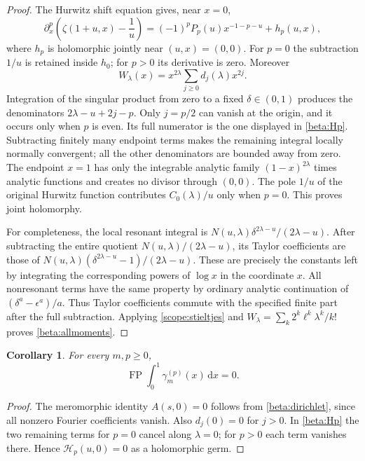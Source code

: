 \documentclass[11pt]{article}
\numberwithin{equation}{section}
\newtheorem{corollary}[theorem]{Corollary}
\theoremstyle{definition}
\theoremstyle{remark}
\DeclareMathOperator{\FP}{FP}
\newcommand{\dd}{\,\mathrm d}
\begin{document}
\begin{proof}
The Hurwitz shift equation gives, near $x=0$,
\begin{equation}\label{beta:local}
 \partial_x^p\left(\zeta(1+u,x)-\frac1u\right)
 =(-1)^pP_p(u)x^{-1-p-u}+h_p(u,x),
\end{equation}
where $h_p$ is holomorphic jointly near $(u,x)=(0,0)$.
For $p=0$ the subtraction $1/u$ is retained inside $h_0$;
for $p>0$ its derivative is zero. Moreover
\[
 W_\lambda(x)=x^{2\lambda}\sum_{j\geq0}d_j(\lambda)x^{2j}.
\]
Integration of the singular product from zero to a fixed
$\delta\in(0,1)$ produces the denominators
$2\lambda-u+2j-p$. Only $j=p/2$ can vanish at the origin, and it
occurs only when $p$ is even. Its full numerator is the one displayed
in \eqref{beta:Hp}. Subtracting finitely many endpoint terms makes
the remaining integral locally normally convergent; all the other
denominators are bounded away from zero. The endpoint $x=1$ has only
the integrable analytic family $(1-x)^{2\lambda}$ times analytic
functions and creates no divisor through $(0,0)$. The pole $1/u$ of
the original Hurwitz function contributes $C_0(\lambda)/u$ only
when $p=0$. This proves joint holomorphy.

For completeness, the local resonant integral is
$N(u,\lambda)\delta^{2\lambda-u}/(2\lambda-u)$. After subtracting
the entire quotient $N(u,\lambda)/(2\lambda-u)$, its Taylor
coefficients are those of
$N(u,\lambda)(\delta^{2\lambda-u}-1)/(2\lambda-u)$.
These are precisely the constants left by integrating the corresponding
powers of $\log x$ in the coordinate $x$. All nonresonant terms have
the same property by ordinary analytic continuation of
$(\delta^a-\epsilon^a)/a$. Thus Taylor coefficients commute with the
specified finite part after the full subtraction. Applying
\eqref{scope:stieltjes} and
$W_\lambda=\sum_k2^k\ell^k\lambda^k/k!$ proves
\eqref{beta:allmoments}.
\end{proof}

\begin{corollary}\label{beta:zero}
For every $m,p\geq0$,
\[
 \FP\int_0^1\gamma_m^{(p)}(x)\dd x=0.
\]
\end{corollary}
\begin{proof}
The meromorphic identity $A(s,0)=0$ follows from
\eqref{beta:dirichlet}, since all nonzero Fourier coefficients
vanish. Also $d_j(0)=0$ for $j>0$. In \eqref{beta:Hp} the two
remaining terms for $p=0$ cancel along $\lambda=0$; for $p>0$ each
term vanishes there. Hence $\mathcal H_p(u,0)=0$ as a holomorphic
germ.
\end{proof}
\end{document}
